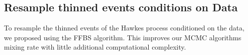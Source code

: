 \documentclass[11pt]{article}
\begin{document}
\subsection{Resample thinned events conditions on Data}

To resample the thinned events of the Hawkes process conditioned on the data, we proposed using the FFBS algorithm. This improves our MCMC algorithms mixing rate with little additional computational complexity.

\begin{comment}

\vspace{1cm}
\noindent\textbf{Probability Event is Thinned}


\[
  P(l_i | X, Y ,U) 
  =
  P(l_i | V)/ P(l_i | \lambda)
  =
  \text{PoissonProcess}(l_i)
\]

\vspace{1cm}
\noindent\textbf{Probability Event is Real}

\noindent Let's compute the probability the event is real. We include a base event at $t = 0$ so all observed events are children and immigrants are direct descendants of this base event. We will suppress the dependence on the parameters $(\vtheta,\alpha,\lambda)$ in our writing. Let $V' = V \setminus \{v_i\}$, $Z' = Z \setminus \{z_i\}$,

\[
  P(a_i \text{ is real } | A \setminus \{a_i\}, X, \vtheta, \alpha, \lambda)
\]
\[
  =
  P(a_i \text{ is real} | A \setminus \{a_i\}, X)
  =
  P(a_i \text{ is real} | V', Z', X)
  \propto
  P(a_i \text{ is real}, V', Z', X)
\]

\[
  =
  P(a_i \text{ is a child of any past event}, V', Z', X)   
\]

\[
  =
  P((v_i,z_i=1) , V', Z', X)   
\]

\noindent In words, we want the probability the virtual event was censored, indicated by $z_i = 1$. Note $v \in V$ is the event time of an event sampled from the Poisson Process and $z \in Z$ is a binary number indicating if the event is virtual or real (censored). Let's define $V_i,Z_i$ to be all the events before $a_i$ and including $(v_i,1)$. E.g. $V_i = \{a_k\}_ {k=1}^{i-1} \cup \{a_i\}$ and $Z_i = \{z_k\}_{k=1}^{i-1} \cup \{1\}$. Now we break up the distribution into its components:

\[
  =
  P(V')P(Z')P(a_i, X | V', Z')
  =
  P(V')P(Z')P(a_i, X | V_i, Z_i)
\]

\[
  =
  \text{PoissonProc}(V'; \lambda)
  \;
  \prod_{z \in Z'}\text{Bernoulli}(z; \alpha) 
  \;
  P(a_i, X | V_i, Z_i)  
\]


\end{comment}
\end{document}
